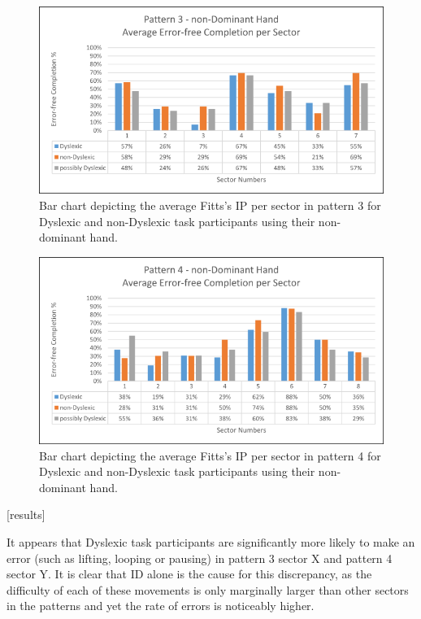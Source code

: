 		\begin{figure}[]
			\centering
			\includegraphics[width = \textwidth]{../images/pat_3_com_ndom}
			\caption{Bar chart depicting the average Fitts's IP per sector in pattern 3 for Dyslexic and non-Dyslexic task participants using their non-dominant hand.}
			\label{fi_pat_3_com_ndom}
		\end{figure}		
		
		\begin{figure}[]
			\centering
			\includegraphics[width = \textwidth]{../images/pat_4_com_ndom}
			\caption{Bar chart depicting the average Fitts's IP per sector in pattern 4 for Dyslexic and non-Dyslexic task participants using their non-dominant hand.}
			\label{fi_pat_4_com_ndom}
		\end{figure}
	
		[results]
		
		It appears that Dyslexic task participants are significantly more likely to make an error (such as lifting, looping or pausing) in pattern 3 sector X and pattern 4 sector Y. It is clear that ID alone is the cause for this discrepancy, as the difficulty of each of these movements is only marginally larger than other sectors in the patterns and yet the rate of errors is noticeably higher.
		
